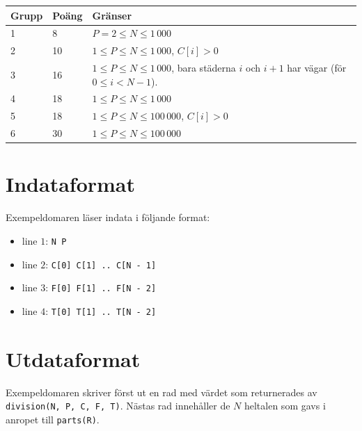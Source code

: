 \begin{tabular}{|l|l|l|}
  \hline
  \textbf{Grupp} & \textbf{Poäng} & \textbf{Gränser} \\ \hline
  1 & 8 & $P = 2 \le N \le 1\,000$ \\ \hline
  2 & 10 & $1 \le P \le N \le 1\,000$, $C[i] > 0$ \\ \hline
  3 & 16 & $1 \le P \le N \le 1\,000$, bara städerna $i$ och $i + 1$ har vägar (för $0 \le i < N - 1$). \\ \hline
  4 & 18 & $1 \le P \le N \le 1\,000$ \\ \hline
  5 & 18 & $1 \le P \le N \le 100\,000$, $C[i] > 0$ \\ \hline
  6 & 30 & $1 \le P \le N \le 100\,000$ \\ \hline
\end{tabular}

\section*{Indataformat}
Exempeldomaren läser indata i följande format:

\begin{itemize}
  \item line $1$: \texttt{N P}
  \item line $2$: \texttt{C[0] C[1] .. C[N - 1]}
  \item line $3$: \texttt{F[0] F[1] .. F[N - 2]}
  \item line $4$: \texttt{T[0] T[1] .. T[N - 2]}
\end{itemize}

\section*{Utdataformat}
Exempeldomaren skriver först ut en rad med värdet som returnerades av \texttt{division(N, P, C, F, T)}.
Nästas rad innehåller de $N$ heltalen som gavs i anropet till \texttt{parts(R)}.

